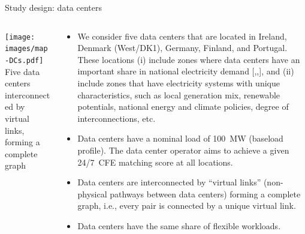 \begin{frame}{Study design: data centers}
  
  {\footnotesize
  \begin{columns}[T]

  \begin{column}{7cm}
  \centering
  \vspace{0.5cm}
  \texttt{[image: images/map-DCs.pdf]}
  {\scriptsize Five data centers interconnected by virtual links, \\ 
  forming a complete graph}
  \end{column}

  \begin{column}{8cm}
  \begin{itemize}
    \item We consider \alert{five data centers} that are located in Ireland, Denmark (West/DK1), Germany, Finland, and Portugal. These locations (i) include zones where data centers have an important share in national electricity demand [,,], and (ii) include zones that have electricity systems with unique characteristics, such as local generation mix, renewable potentials, national energy and climate policies, degree of interconnections, etc. 
    \item Data centers have a nominal load of \alert{100~MW} (baseload profile). The data center operator aims to achieve a given 24/7~CFE matching score \alert{at all locations}. 
    \item Data centers are interconnected by \enquote{virtual links} (non-physical pathways between data centers) forming a \alert{complete graph}, i.e., every pair is connected by a unique virtual link.
    \item Data centers have the \alert{same share of flexible workloads}. 
  \end{itemize}

  \end{column}
  \end{columns}
  }

\end{frame}



